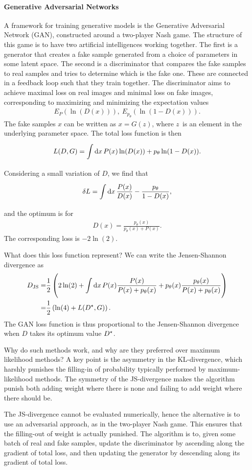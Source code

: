 \paragraph{Generative Adversarial Networks}
A framework for training generative models is the Generative Adversarial Network (GAN), constructed around a two-player Nash game. The structure of this game is to have two artificial intelligences working together. The first is a generator that creates a fake sample generated from a choice of parameters in some latent space. The second is a discriminator that compares the fake samples to real samples and tries to determine which is the fake one. These are connected in a feedback loop such that they train together. The discriminator aims to achieve maximal loss on real images and minimal loss on fake images, corresponding to maximizing and minimizing the expectation values
\begin{align*}
	E_{P}(\ln(D(x))),\ E_{p_{\theta}}(\ln(1 - D(x))).
\end{align*}
The fake samples $x$ can be written as $x = G(z)$, where $z$ is an element in the underlying parameter space. The total loss function is then
\begin{align*}
	L(D, G) = \int\limits_{}^{}\dd{x}P(x)\ln(D(x)) + p_{\theta}\ln(1 - D(x)).
\end{align*}
Considering a small variation of $D$, we find that
\begin{align*}
	\var{L} = \int\limits_{}^{}\dd{x}\frac{P(x)}{D(x)} - \frac{p_{\theta}}{1 - D(x)},
\end{align*}
and the optimum is for
\begin{align*}
	D(x) = \frac{p_{\theta}(x)}{p_{\theta}(x) + P(x)}.
\end{align*}
The corresponding loss is $-2\ln(2)$.

What does this loss function represent? We can write the Jensen-Shannon divergence as
\begin{align*}
	D_{\text{JS}} =& \frac{1}{2}\left(2\ln(2) + \int\limits_{}^{}\dd{x}P(x)\frac{P(x)}{P(x) + p_{\theta}(x)} + p_{\theta}(x)\frac{p_{\theta}(x)}{P(x) + p_{\theta}(x)}\right) \\
	              =& \frac{1}{2}\left(\ln(4) + L(D^{\star}, G)\right).
\end{align*}
The GAN loss function is thus proportional to the Jensen-Shannon divergence when $D$ takes its optimum value $D^{\star}$.

Why do such methods work, and why are they preferred over maximum likelihood methods? A key point is the asymmetry in the KL-divergence, which harshly punishes the filling-in of probability typically performed by maximum-likelihood methods. The symmetry of the JS-divergence makes the algorithm punish both adding weight where there is none and failing to add weight where there should be.

The JS-divergence cannot be evaluated numerically, hence the alternative is to use an adversarial approach, as in the two-player Nash game. This ensures that the filling-out of weight is actually punished. The algorithm is to, given some batch of real and fake samples, update the discriminator by ascending along the gradient of total loss, and then updating the generator by descending along its gradient of total loss.